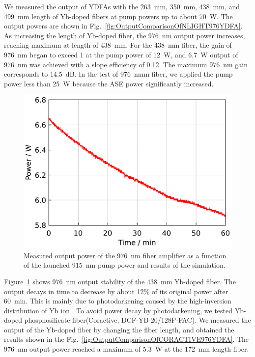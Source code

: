\documentclass{osa-article}
\begin{document}
We measured the output of YDFAs with the \SI{263}{mm}, \SI{350}{mm}, \SI{438}{mm}, and \SI{499}{mm} length of Yb-doped fibers at pump powers up to about \SI{70}{W}.
The output powers are shown in Fig.~\ref{fig:OutputComparisonOfNLIGHT976YDFA}.
As increasing the length of Yb-doped fiber, the \SI{976}{nm} output power increases, reaching maximum at length of \SI{438}{mm}.
For the \SI{438}{mm} fiber, the gain of \SI{976}{nm} began to exceed 1 at the pump power of \SI{12}{W}, and \SI{6.7}{W} output of \SI{976}{nm} was achieved with a slope efficiency of 0.12.
The maximum \SI{976}{nm} gain corresponds to \SI{14.5}{dB}.
In the test of \SI{976}{nmm} fiber, we applied the pump power less than \SI{25}{W} because the ASE power significantly increased.

\begin{figure}[h!]
  \centering
  \begin{minipage}[b]{0.5\linewidth}
    \centering
    \includegraphics[keepaspectratio, width=0.9\linewidth]{./Figure/Yb1200-20-125DC-PM438mm_LongTermStability_915Pump70W976Seed0.24W_Exp}
  \end{minipage}
  \caption{Measured output power of the \SI{976}{nm} fiber amplifier as a function of the launched \SI{915}{nm} pump power and results of the simulation.}
  \label{fig:LongTermStabilityOfNLIGHT976YDFA}
\end{figure}

Figure~\ref{fig:LongTermStabilityOfNLIGHT976YDFA} shows \SI{976}{nm} output stability of the \SI{438}{mm} Yb-doped fiber.
The output decays in time to decrease by about 12\% of its original power after \SI{60}{\minute}.
This is mainly due to photodarkening caused by the high-inversion distribution of Yb ion \cite{paschottaLifetimeQuenchingYbdoped1997}.
To avoid power decay by photodarkening, we tested Yb-doped phosphosilicate fiber(Coractive, DCF-YB-20/128P-FAC).
We measured the output of the Yb-doped fiber by changing the fiber length, and obtained the results shown in the Fig.~\ref{fig:OutputComparisonOfCORACTIVE976YDFA}.
The \SI{976}{nm} output power reached a maximum of \SI{5.3}{W} at the \SI{172}{mm} length fiber.
\end{document}

